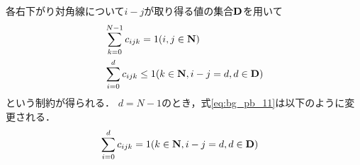 各右下がり対角線について$i-j$が取り得る値の集合$\bf D$を用いて
\begin{eqnarray}
    & \sum_{k=0}^{N-1} c_{ijk} = 1     (i,j \in {\bf N})    \label{eq:bg_pb_10}\\
    & \sum_{i=0}^{d} c_{ijk} \leq 1  (k \in {\bf N}, i-j=d, d \in {\bf D}) \label{eq:bg_pb_11}
\end{eqnarray}
という制約が得られる．
$d=N-1$のとき，式\ref{eq:bg_pb_11}は以下のように変更される．
\begin{eqnarray}
    & \sum_{i=0}^{d} c_{ijk} = 1  (k \in {\bf N}, i-j=d, d \in {\bf D}) \label{eq:bg_pb_12}
\end{eqnarray}



%
%
%



